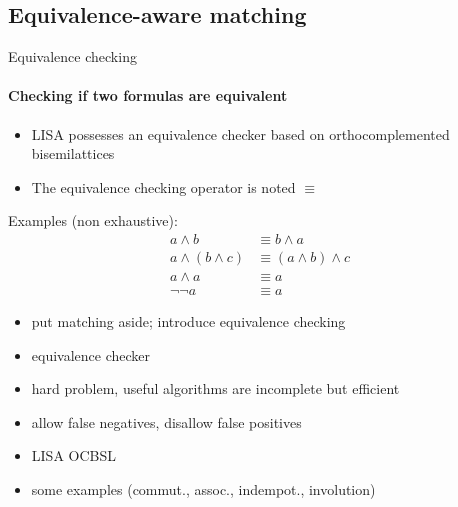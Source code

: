 
\subsection{Equivalence-aware matching}

\begin{frame}{Equivalence checking}
\framesubtitle{Checking if two formulas are equivalent}

\begin{itemize}
\item LISA possesses an equivalence checker based on orthocomplemented bisemilattices
\item The equivalence checking operator is noted $\equiv$
\end{itemize}

\vspace{0.25cm}

Examples (non exhaustive):
\begin{align*}
a \land b &\equiv b \land a \\
a \land (b \land c) &\equiv (a \land b) \land c \\
a \land a &\equiv a \\
\neg\neg a &\equiv a
\end{align*}

{
\begin{itemize}
\item put matching aside; introduce equivalence checking
\item equivalence checker
\item hard problem, useful algorithms are incomplete but efficient
\item allow false negatives, disallow false positives
\item LISA OCBSL
\item some examples (commut., assoc., indempot., involution)
\end{itemize}
}

\end{frame}


